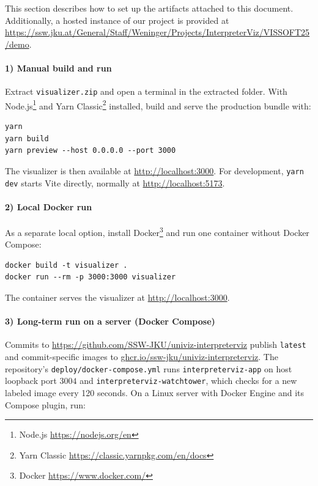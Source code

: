 \documentclass[conference]{IEEEtran}
\begin{document}
This section describes how to set up the artifacts attached to this document. Additionally, a hosted instance of our project is provided at \url{https://ssw.jku.at/General/Staff/Weninger/Projects/InterpreterViz/VISSOFT25/demo}.

\paragraph{1) Manual build and run} Extract \texttt{visualizer.zip} and open a terminal in the extracted folder. With Node.js\footnote{Node.js \url{https://nodejs.org/en}} and Yarn Classic\footnote{Yarn Classic \url{https://classic.yarnpkg.com/en/docs}} installed, build and serve the production bundle with:

\begin{lstlisting}[language={},numbers=none,basicstyle=\ttfamily\scriptsize]
yarn
yarn build
yarn preview --host 0.0.0.0 --port 3000
\end{lstlisting}

The visualizer is then available at \url{http://localhost:3000}. For development, \texttt{yarn dev} starts Vite directly, normally at \url{http://localhost:5173}.

\paragraph{2) Local Docker run} As a separate local option, install Docker\footnote{Docker \url{https://www.docker.com/}} and run one container without Docker Compose:

\begin{lstlisting}[language={},numbers=none,basicstyle=\ttfamily\scriptsize]
docker build -t visualizer .
docker run --rm -p 3000:3000 visualizer
\end{lstlisting}

The container serves the visualizer at \url{http://localhost:3000}.

\paragraph{3) Long-term run on a server (Docker Compose)} Commits to \url{https://github.com/SSW-JKU/univiz-interpreterviz} publish \texttt{latest} and commit-specific images to \url{ghcr.io/ssw-jku/univiz-interpreterviz}. The repository's \texttt{deploy/docker-compose.yml} runs \texttt{interpreterviz-app} on host loopback port $3004$ and \texttt{interpreterviz-watchtower}, which checks for a new labeled image every 120 seconds. On a Linux server with Docker Engine and its Compose plugin, run:
\end{document}
